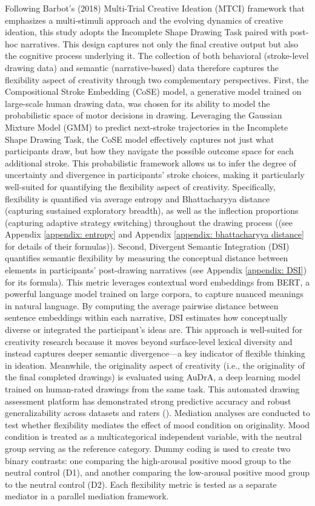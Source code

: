 \documentclass[../MA_Thesis.tex]{subfiles}
\begin{document}
Following Barbot’s (2018) Multi-Trial Creative Ideation (MTCI) framework that emphasizes a multi-stimuli approach and the evolving dynamics of creative ideation, this study adopts the Incomplete Shape Drawing Task paired with post-hoc narratives. This design captures not only the final creative output but also the cognitive process underlying it. The collection of both behavioral (stroke-level drawing data) and semantic (narrative-based) data therefore captures the flexibility aspect of creativity through two complementary perspectives. First, the Compositional Stroke Embedding (CoSE) model, a generative model trained on large-scale human drawing data, was chosen for its ability to model the probabilistic space of motor decisions in drawing. Leveraging the Gaussian Mixture Model (GMM) to predict next-stroke trajectories in the Incomplete Shape Drawing Task, the CoSE model effectively captures not just what participants draw, but how they navigate the possible outcome space for each additional stroke. This probabilistic framework allows us to infer the degree of uncertainty and divergence in participants’ stroke choices, making it particularly well-suited for quantifying the flexibility aspect of creativity. Specifically, flexibility is quantified via average entropy and Bhattacharyya distance (capturing sustained exploratory breadth), as well as the inflection proportions (capturing adaptive strategy switching) throughout the drawing process ((see Appendix \ref{appendix: entropy} and Appendix \ref{appendix: bhattacharyya distance} for details of their formulas)). Second, Divergent Semantic Integration (DSI) quantifies semantic flexibility by measuring the conceptual distance between elements in participants’ post-drawing narratives (see Appendix \ref{appendix: DSI}) for its formula). This metric leverages contextual word embeddings from BERT, a powerful language model trained on large corpora, to capture nuanced meanings in natural language. By computing the average pairwise distance between sentence embeddings within each narrative, DSI estimates how conceptually diverse or integrated the participant’s ideas are. This approach is well-suited for creativity research because it moves beyond surface-level lexical diversity and instead captures deeper semantic divergence—a key indicator of flexible thinking in ideation. Meanwhile, the originality aspect of creativity (i.e., the originality of the final completed drawings) is evaluated using AuDrA, a deep learning model trained on human-rated drawings from the same task. This automated drawing assessment platform has demonstrated strong predictive accuracy and robust generalizability across datasets and raters (\cite{patterson_audra_2023}). Mediation analyses are conducted to test whether flexibility mediates the effect of mood condition on originality. Mood condition is treated as a multicategorical independent variable, with the neutral group serving as the reference category. Dummy coding is used to create two binary contrasts: one comparing the high-arousal positive mood group to the neutral control (D1), and another comparing the low-arousal positive mood group to the neutral control (D2). Each flexibility metric is tested as a separate mediator in a parallel mediation framework.
\end{document}
